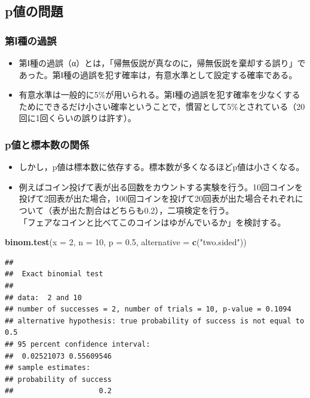 \documentclass[]{article}
\newenvironment{Shaded}{\begin{snugshade}}{\end{snugshade}}
\newcommand{\KeywordTok}[1]{\textcolor[rgb]{0.13,0.29,0.53}{\textbf{#1}}}
\newcommand{\DataTypeTok}[1]{\textcolor[rgb]{0.13,0.29,0.53}{#1}}
\newcommand{\DecValTok}[1]{\textcolor[rgb]{0.00,0.00,0.81}{#1}}
\newcommand{\FloatTok}[1]{\textcolor[rgb]{0.00,0.00,0.81}{#1}}
\newcommand{\StringTok}[1]{\textcolor[rgb]{0.31,0.60,0.02}{#1}}
\newcommand{\NormalTok}[1]{#1}
\providecommand{\tightlist}{%
  \setlength{\itemsep}{0pt}\setlength{\parskip}{0pt}}
\begin{document}
\subsection{p値の問題}\label{p}

\subsubsection{第Ⅰ種の過誤}

\begin{itemize}
\tightlist
\item
  第Ⅰ種の過誤（α）とは，「帰無仮説が真なのに，帰無仮説を棄却する誤り」であった。第Ⅰ種の過誤を犯す確率は，有意水準として設定する確率である。
\item
  有意水準は一般的に5\%が用いられる。第Ⅰ種の過誤を犯す確率を少なくするためにできるだけ小さい確率ということで，慣習として5\%とされている（20回に1回くらいの誤りは許す）。
\end{itemize}

\subsubsection{p値と標本数の関係}\label{p}

\begin{itemize}
\item
  しかし，p値は標本数に依存する。標本数が多くなるほどp値は小さくなる。
\item
  例えばコイン投げて表が出る回数をカウントする実験を行う。10回コインを投げて2回表が出た場合，100回コインを投げて20回表が出た場合それぞれについて（表が出た割合はどちらも0.2），二項検定を行う。\\
  「フェアなコインと比べてこのコインはゆがんでいるか」を検討する。
\end{itemize}

\begin{Shaded}
\begin{Highlighting}[]
\KeywordTok{binom.test}\NormalTok{(}\DataTypeTok{x =} \DecValTok{2}\NormalTok{, }\DataTypeTok{n =} \DecValTok{10}\NormalTok{, }\DataTypeTok{p =} \FloatTok{0.5}\NormalTok{, }\DataTypeTok{alternative =} \KeywordTok{c}\NormalTok{(}\StringTok{"two.sided"}\NormalTok{))}
\end{Highlighting}
\end{Shaded}

\begin{verbatim}
## 
##  Exact binomial test
## 
## data:  2 and 10
## number of successes = 2, number of trials = 10, p-value = 0.1094
## alternative hypothesis: true probability of success is not equal to 0.5
## 95 percent confidence interval:
##  0.02521073 0.55609546
## sample estimates:
## probability of success 
##                    0.2
\end{verbatim}
\end{document}
